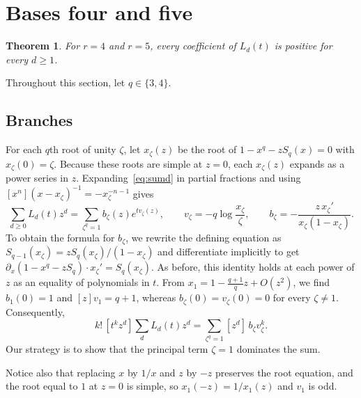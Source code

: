 \documentclass[11pt]{amsart}
\newtheorem{theorem}{Theorem}[section]
\theoremstyle{remark}
\begin{document}
\section{Bases four and five}\label{sec:45}

\begin{theorem}\label{thm:45}
For $r=4$ and $r=5$, every coefficient of $L_d(t)$ is positive for every $d\ge1$.
\end{theorem}

Throughout this section, let $q\in\{3,4\}$.

\subsection{Branches}
For each $q$th root of unity $\zeta$, let $x_\zeta(z)$ be the root of
$1-x^q-zS_q(x)=0$ with $x_\zeta(0)=\zeta$. Because these roots are simple at
$z=0$, each $x_\zeta(z)$ expands as a power series in $z$. Expanding~\eqref{eq:sumd}
in partial fractions and using $[x^n](x-x_\zeta)^{-1}=-x_\zeta^{-n-1}$ gives
\begin{equation}\label{eq:branches}
 \sum_{d\ge0}L_d(t)z^d=\sum_{\zeta^q=1}b_\zeta(z)e^{tv_\zeta(z)},\qquad
 v_\zeta=-q\log\frac{x_\zeta}{\zeta},\qquad
 b_\zeta=-\frac{z\,x_\zeta'}{x_\zeta(1-x_\zeta)}.
\end{equation}
To obtain the formula for $b_\zeta$, we rewrite the defining equation as
$S_{q-1}(x_\zeta)=zS_q(x_\zeta)/(1-x_\zeta)$ and differentiate implicitly to
get $\partial_x(1-x^q-zS_q)\cdot x_\zeta'=S_q(x_\zeta)$. As before, this
identity holds at each power of $z$ as an equality of polynomials in $t$. From
$x_1=1-\frac{q+1}{q}z+O(z^2)$, we find $b_1(0)=1$ and $[z]v_1=q+1$, whereas
$b_\zeta(0)=v_\zeta(0)=0$ for every $\zeta\ne1$. Consequently,
\begin{equation}\label{eq:tk}
 k!\,[t^kz^d]\sum_{d}L_d(t)z^d=\sum_{\zeta^q=1}[z^d]\,b_\zeta v_\zeta^k .
\end{equation}
Our strategy is to show that the principal term $\zeta=1$ dominates the sum.

Notice also that replacing $x$ by $1/x$ and $z$ by $-z$ preserves the root
equation, and the root equal to $1$ at $z=0$ is simple, so $x_1(-z)=1/x_1(z)$ and
$v_1$ is odd.
\end{document}
